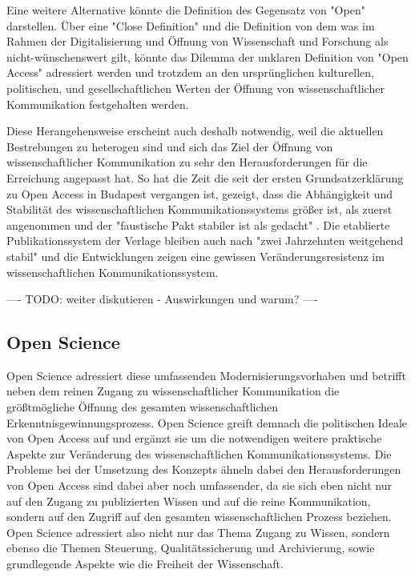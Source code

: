 Eine weitere Alternative könnte die Definition des Gegensatz von "Open" darstellen. Über eine "Close Definition" und die Definition von dem was im Rahmen der Digitalisierung und Öffnung von Wissenschaft und Forschung als nicht-wünschenswert gilt, könnte das Dilemma der unklaren Definition von "Open Access" adressiert werden und trotzdem an den ursprünglichen kulturellen, politischen, und gesellschaftlichen Werten der Öffnung von wissenschaftlicher Kommunikation festgehalten werden.

Diese Herangehensweise erscheint auch deshalb notwendig, weil die aktuellen Bestrebungen zu heterogen sind und sich das Ziel der Öffnung von wissenschaftlicher Kommunikation zu sehr den Herausforderungen für die Erreichung angepasst hat. So hat die Zeit die seit der ersten Grundsatzerklärung zu Open Access in Budapest vergangen ist, gezeigt, dass die Abhängigkeit und Stabilität des wissenschaftlichen Kommunikationssystems größer ist, als zuerst angenommen und der "faustische Pakt stabiler ist als gedacht" \cite{hagner_2015_sache_buches}. Die etablierte Publikationssystem der Verlage bleiben auch nach "zwei Jahrzehnten weitgehend stabil" \cite{Hanekop_2014} und die Entwicklungen zeigen eine gewissen Veränderungsresistenz im wissenschaftlichen Kommunikationssystem.

---- TODO: weiter diskutieren - Auswirkungen und warum? ----

\subsection{Open Science}

Open Science adressiert diese umfassenden Modernisierungsvorhaben und betrifft neben dem reinen Zugang zu wissenschaftlicher Kommunikation die größtmögliche Öffnung des gesamten wissenschaftlichen Erkenntnisgewinnungsprozess. Open Science greift demnach die politischen Ideale von Open Access auf und ergänzt sie um die notwendigen weitere praktische Aspekte zur Veränderung des wissenschaftlichen Kommunikationssystems. Die Probleme bei der Umsetzung des Konzepts ähneln dabei den Herausforderungen von Open Access sind dabei aber noch umfassender, da sie sich eben nicht nur auf den Zugang zu publizierten Wissen und auf die reine Kommunikation, sondern auf den Zugriff auf den gesamten wissenschaftlichen Prozess beziehen. Open Science adressiert also nicht nur das Thema Zugang zu Wissen, sondern ebenso die Themen Steuerung, Qualitätssicherung und Archivierung, sowie grundlegende Aspekte wie die Freiheit der Wissenschaft.

